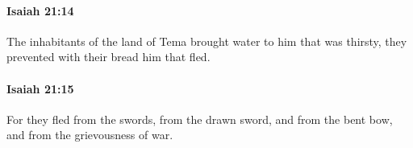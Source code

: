 		\paragraph{Isaiah 21:14} %
			\label{ISAIAH-21-14}

			The inhabitants of the land of Tema brought water to him that was thirsty, they prevented with their bread him that fled.


		\paragraph{Isaiah 21:15} %
			\label{ISAIAH-21-15}

			For they fled from the swords, from the drawn sword, and from the bent bow, and from the grievousness of war.


